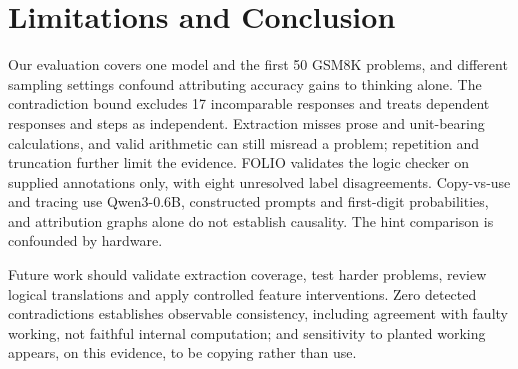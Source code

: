 \section{Limitations and Conclusion}\label{sec:conclusion}
Our evaluation covers one model and the first 50 GSM8K problems, and different
sampling settings confound attributing accuracy gains to thinking alone. The
contradiction bound excludes 17 incomparable responses and treats dependent responses
and steps as independent. Extraction misses prose and unit-bearing calculations, and
valid arithmetic can still misread a problem; repetition and truncation further limit
the evidence. FOLIO validates the logic checker on supplied annotations only, with
eight unresolved label disagreements. Copy-vs-use and tracing use Qwen3-0.6B,
constructed prompts and first-digit probabilities, and attribution graphs alone do not
establish causality. The hint comparison is confounded by hardware.

Future work should validate extraction coverage, test harder problems, review logical
translations and apply controlled feature interventions. Zero detected contradictions
establishes observable consistency, including agreement with faulty working, not
faithful internal computation; and sensitivity to planted working appears, on this
evidence, to be copying rather than use.
